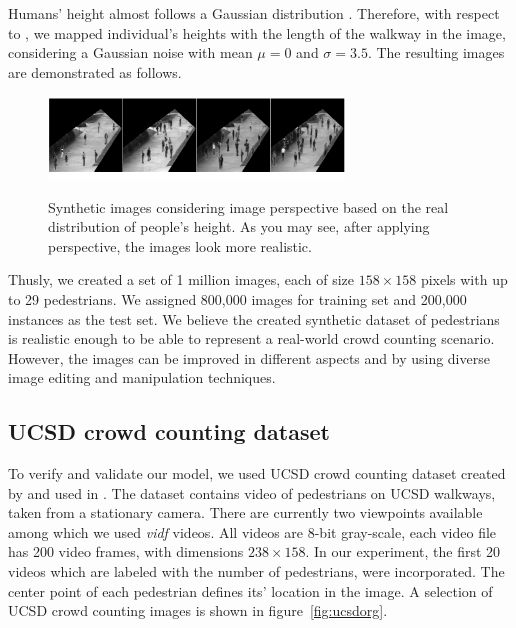 \begin{itemize}
Humans' height almost follows a Gaussian distribution \cite{subramanian2011height}. Therefore, with respect to \cite{subramanian2011height, garcia2007evolution}, we mapped individual's heights with the length of the walkway in the image, considering a Gaussian noise with mean $\mu = 0$ and $\sigma = 3.5$. The resulting images are demonstrated as follows.

\begin{figure}[H]
	\centering
	{\includegraphics[width=0.7\textwidth]{images/pers}}
	\caption{Synthetic images considering image perspective based on the real distribution of people's height. As you may see, after applying perspective, the images look more realistic. }
	\label{fig:pers}
\end{figure}


\end{itemize}

\noindent Thusly, we created a set of 1 million images, each of size $158\times158$ pixels with up to 29 pedestrians. We assigned 800,000 images for training set and 200,000 instances as the test set. We believe the created synthetic dataset of pedestrians is realistic enough to be able to represent a real-world crowd counting scenario. However, the images can be improved in different aspects and by using diverse image editing and manipulation techniques. 

\subsection{UCSD crowd counting dataset}
\label{subsec:datareal2}
To verify and validate our model, we used UCSD crowd counting dataset created by \citeauthor*{chan2008privacy} and used in \cite{chan2008privacy,chan2009bayesian,chan2012counting}. The dataset contains video of pedestrians on UCSD walkways, taken from a stationary camera. There are currently two  viewpoints available among which we used \textit{vidf} videos. All videos are 8-bit gray-scale, each video file has 200 video frames, with dimensions $238\times158$. In our experiment, the first 20 videos which are labeled with the number of pedestrians, were incorporated. The center point of each pedestrian defines its' location in the image. A selection of UCSD crowd counting images is shown in figure~\ref{fig:ucsdorg}.

